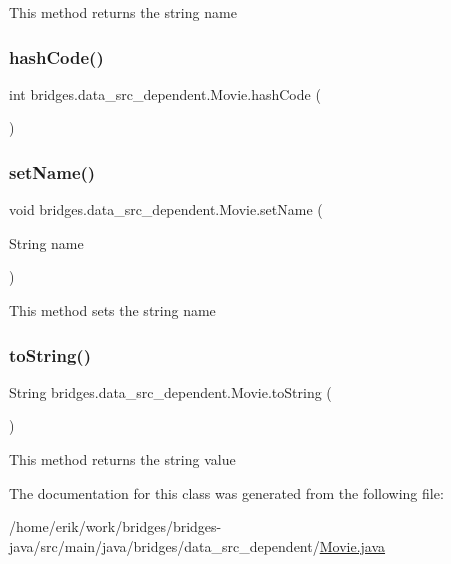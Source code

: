 This method returns the string name \mbox{\label{classbridges_1_1data__src__dependent_1_1_movie_a20fffd543345ecc7b171d3ccccffc882}} 
\subsubsection{\texorpdfstring{hash\+Code()}{hashCode()}}
{\footnotesize\ttfamily int bridges.\+data\+\_\+src\+\_\+dependent.\+Movie.\+hash\+Code (\begin{DoxyParamCaption}{ }\end{DoxyParamCaption})}

\mbox{\label{classbridges_1_1data__src__dependent_1_1_movie_a1b4a3072962e5d35f035fad21b73f0f1}} 
\subsubsection{\texorpdfstring{set\+Name()}{setName()}}
{\footnotesize\ttfamily void bridges.\+data\+\_\+src\+\_\+dependent.\+Movie.\+set\+Name (\begin{DoxyParamCaption}\item[{String}]{name }\end{DoxyParamCaption})}

This method sets the string name \mbox{\label{classbridges_1_1data__src__dependent_1_1_movie_a99d2b0845c4cbbbc141d38b5518704c6}} 
\subsubsection{\texorpdfstring{to\+String()}{toString()}}
{\footnotesize\ttfamily String bridges.\+data\+\_\+src\+\_\+dependent.\+Movie.\+to\+String (\begin{DoxyParamCaption}{ }\end{DoxyParamCaption})}

This method returns the string value 

The documentation for this class was generated from the following file\+:\begin{DoxyCompactItemize}
\item 
/home/erik/work/bridges/bridges-\/java/src/main/java/bridges/data\+\_\+src\+\_\+dependent/\hyperlink{_movie_8java}{Movie.\+java}\end{DoxyCompactItemize}
